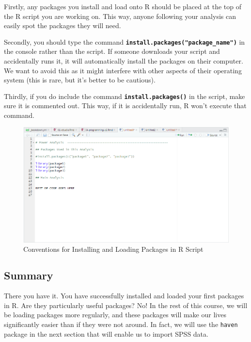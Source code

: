 \documentclass[
]{book}
\begin{document}
Firstly, any packages you install and load onto R should be placed at the top of the R script you are working on. This way, anyone following your analysis can easily spot the packages they will need.

Secondly, you should type the command \textbf{\texttt{install.packages("package\_name")}} in the console rather than the script. If someone downloads your script and accidentally runs it, it will automatically install the packages on their computer. We want to avoid this as it might interfere with other aspects of their operating system (this is rare, but it's better to be cautious).

Thirdly, if you do include the command \textbf{\texttt{install.packages()}} in the script, make sure it is commented out. This way, if it is accidentally run, R won't execute that command.

\begin{figure}
\centering
\includegraphics{img/04-packages-convention.png}
\caption{\label{fig:unnamed-chunk-159}Conventions for Installing and Loading Packages in R Script}
\end{figure}

\hypertarget{summary-3}{%
\subsection{Summary}\label{summary-3}}

There you have it. You have successfully installed and loaded your first packages in R. Are they particularly useful packages? No! In the rest of this course, we will be loading packages more regularly, and these packages will make our lives significantly easier than if they were not around. In fact, we will use the \texttt{haven} package in the next section that will enable us to import SPSS data.
\end{document}

